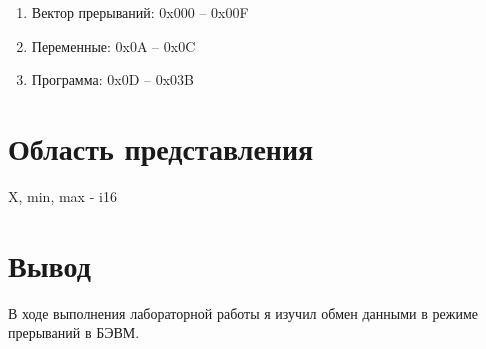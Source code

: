 \documentclass{article}
\begin{document}
\begin{enumerate}
  \item Вектор прерываний: 0x000 – 0x00F
  \item Переменные: 0x0A – 0x0C
  \item Программа: 0x0D – 0x03B
\end{enumerate}


\section{Область представления}

X, min, max - i16

\section{Вывод}

В ходе выполнения лабораторной работы я изучил обмен данными в режиме прерываний в БЭВМ.
\end{document}
